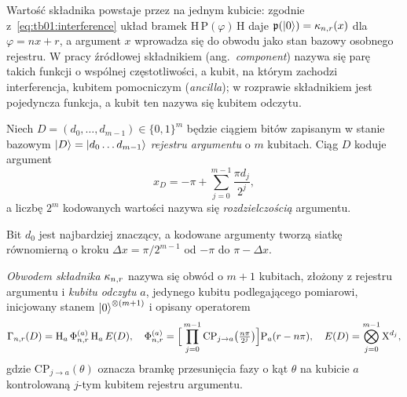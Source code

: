 Wartość składnika powstaje przez  na jednym kubicie: zgodnie z~\eqref{eq:tb01:interference} układ bramek $\mathrm{H}\,\mathrm{P}(\varphi)\,\mathrm{H}$ daje $\mathfrak{p}(\ket{0})=\kappa_{n,r}(x)$ dla $\varphi=nx+r$, a argument $x$ wprowadza się do obwodu jako stan bazowy osobnego rejestru.
W pracy źródłowej składnikiem (ang.\ \emph{component}) nazywa się parę takich funkcji o wspólnej częstotliwości, a kubit, na którym zachodzi interferencja, kubitem pomocniczym (\emph{ancilla}); w rozprawie składnikiem jest pojedyncza funkcja, a kubit ten nazywa się kubitem odczytu.

\begin{Definition}\label{def:tb:qsamp:argument}
Niech $D=(d_0,\dots,d_{m-1})\in\{0,1\}^{m}$ będzie ciągiem bitów zapisanym w stanie bazowym $\ket{D}=\ket{d_0\dots d_{m-1}}$ \emph{rejestru argumentu} o $m$ kubitach.
Ciąg $D$ koduje argument
\begin{equation}\label{eq:tb:qsamp:argument}
x_D=-\pi+\sum_{j=0}^{m-1}\frac{\pi d_j}{2^{j}} ,
\end{equation}
a liczbę $2^{m}$ kodowanych wartości nazywa się \emph{rozdzielczością} argumentu.
\end{Definition}

Bit $d_0$ jest najbardziej znaczący, a kodowane argumenty tworzą siatkę równomierną o kroku $\Delta x=\pi/2^{m-1}$ od $-\pi$ do $\pi-\Delta x$.

\begin{Definition}\label{def:tb:qsamp:circuit}
\emph{Obwodem składnika} $\kappa_{n,r}$ nazywa się obwód o $m+1$ kubitach, złożony z rejestru argumentu i \emph{kubitu odczytu} $a$, jedynego kubitu podlegającego pomiarowi, inicjowany stanem $\ket{0}^{\otimes(m+1)}$ i opisany operatorem
\begin{equation}\label{eq:tb:qsamp:circuit}
\Gamma_{n,r}(D)=\mathrm{H}_a\,\Phi^{(a)}_{n,r}\,\mathrm{H}_a\,E(D),
\quad
\Phi^{(a)}_{n,r}=\Bigl[\,\prod_{j=0}^{m-1}\mathrm{CP}_{j\to a}\bigl(\tfrac{n\pi}{2^{j}}\bigr)\Bigr]\mathrm{P}_a(r-n\pi),
\quad
E(D)=\bigotimes_{j=0}^{m-1}\mathrm{X}^{d_j},
\end{equation}
gdzie $\mathrm{CP}_{j\to a}(\theta)$ oznacza bramkę przesunięcia fazy o kąt $\theta$ na kubicie $a$ kontrolowaną $j$-tym kubitem rejestru argumentu.
\end{Definition}

